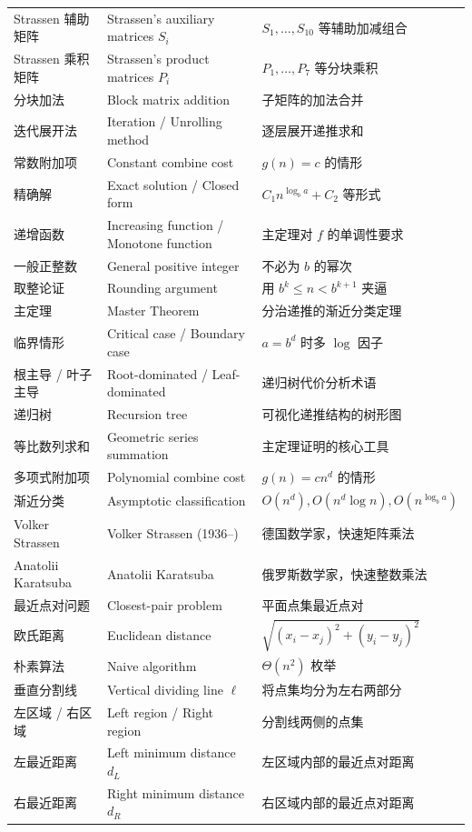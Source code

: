 \documentclass[UTF8,11pt,a4paper]{ctexbook}   %
\theoremstyle{definition}
\begin{document}
\begin{longtable}{|p{4.8cm}|p{4.8cm}|p{4.8cm}|}
Strassen 辅助矩阵 & Strassen's auxiliary matrices $S_i$ & $S_1,\dots,S_{10}$ 等辅助加减组合 \\
Strassen 乘积矩阵 & Strassen's product matrices $P_i$ & $P_1,\dots,P_7$ 等分块乘积 \\
分块加法 & Block matrix addition & 子矩阵的加法合并 \\
迭代展开法 & Iteration / Unrolling method & 逐层展开递推求和 \\
常数附加项 & Constant combine cost & $g(n)=c$ 的情形 \\
精确解 & Exact solution / Closed form & $C_1 n^{\log_b a} + C_2$ 等形式 \\
递增函数 & Increasing function / Monotone function & 主定理对 $f$ 的单调性要求 \\
一般正整数 & General positive integer & 不必为 $b$ 的幂次 \\
取整论证 & Rounding argument & 用 $b^k\le n<b^{k+1}$ 夹逼 \\
主定理 & Master Theorem & 分治递推的渐近分类定理 \\
临界情形 & Critical case / Boundary case & $a=b^d$ 时多 $\log$ 因子 \\
根主导 / 叶子主导 & Root-dominated / Leaf-dominated & 递归树代价分析术语 \\
递归树 & Recursion tree & 可视化递推结构的树形图 \\
等比数列求和 & Geometric series summation & 主定理证明的核心工具 \\
多项式附加项 & Polynomial combine cost & $g(n)=cn^d$ 的情形 \\
渐近分类 & Asymptotic classification & $O(n^d), O(n^d\log n), O(n^{\log_b a})$ \\
Volker Strassen & Volker Strassen (1936--) & 德国数学家，快速矩阵乘法 \\
Anatolii Karatsuba & Anatolii Karatsuba & 俄罗斯数学家，快速整数乘法 \\
\hline
最近点对问题 & Closest-pair problem & 平面点集最近点对 \\
欧氏距离 & Euclidean distance & $\sqrt{(x_i-x_j)^2+(y_i-y_j)^2}$ \\
朴素算法 & Naive algorithm & $\Theta(n^2)$ 枚举 \\
垂直分割线 & Vertical dividing line $\ell$ & 将点集均分为左右两部分 \\
左区域 / 右区域 & Left region / Right region & 分割线两侧的点集 \\
左最近距离 & Left minimum distance $d_L$ & 左区域内部的最近点对距离 \\
右最近距离 & Right minimum distance $d_R$ & 右区域内部的最近点对距离 \\

\end{longtable}
\end{document}
